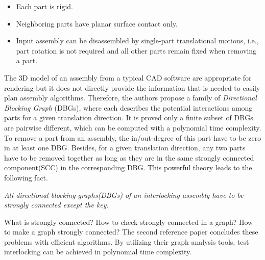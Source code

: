 \begin{itemize}[leftmargin=*]
	\item Each part is rigid.
	\vspace*{1mm}
	\item Neighboring parts have planar surface contact only.
	\vspace*{1mm}
	\item Input assembly can be disassembled by single-part translational motions, i.e., part rotation is not required and all other parts remain fixed when removing a part.
\end{itemize}
The 3D model of an assembly from a typical CAD software are appropriate for rendering but it does not directly provide the information that is needed to easily plan assembly algorithms. Therefore, the authors propose a family of {\em Directional Blocking Graph} (DBGs), where each describes the potential interactions among parts for a given translation direction. It is proved only a finite subset of DBGs are pairwise different, which can be computed with a polynomial time complexity. To remove a part from an assembly, the in/out-degree of this part have to be zero in at least one DBG. Besides, for a given translation direction, any two parts have to be removed together as long as they are in the same strongly connected component(SCC) in the corresponding DBG. This powerful theory leads to the following fact.

\begin{displayquote}
	\em All directional blocking graphs(DBGs) of an interlocking assembly have to be strongly connected except the key.
\end{displayquote}
What is strongly connected? How to check strongly connected in a graph? How to make a graph strongly connected? The second reference paper \cite{Tarjan-1972-SCC} concludes these problems with efficient algorithms. By utilizing their graph analysis tools, test interlocking can be achieved in polynomial time complexity.

